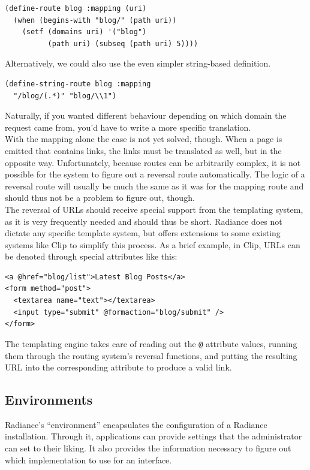 \documentclass{sig-alternate}
\begin{document}
\begin{verbatim}
(define-route blog :mapping (uri)
  (when (begins-with "blog/" (path uri))
    (setf (domains uri) '("blog")
          (path uri) (subseq (path uri) 5))))
\end{verbatim}

Alternatively, we could also use the even simpler string-based definition.

\begin{verbatim}
(define-string-route blog :mapping
  "/blog/(.*)" "blog/\\1")
\end{verbatim}

Naturally, if you wanted different behaviour depending on which domain the request came from, you'd have to write a more specific translation. \\

With the mapping alone the case is not yet solved, though. When a page is emitted that contains links, the links must be translated as well, but in the opposite way. Unfortunately, because routes can be arbitrarily complex, it is not possible for the system to figure out a reversal route automatically. The logic of a reversal route will usually be much the same as it was for the mapping route and should thus not be a problem to figure out, though. \\

The reversal of URLs should receive special support from the templating system, as it is very frequently needed and should thus be short. Radiance does not dictate any specific template system, but offers extensions to some existing systems like Clip\cite{clip} to simplify this process. As a brief example, in Clip, URLs can be denoted through special attributes like this:

\begin{verbatim}
<a @href="blog/list">Latest Blog Posts</a>
<form method="post">
  <textarea name="text"></textarea>
  <input type="submit" @formaction="blog/submit" />
</form>
\end{verbatim}

The templating engine takes care of reading out the \texttt{@} attribute values, running them through the routing system's reversal functions, and putting the resulting URL into the corresponding attribute to produce a valid link.

\subsection{Environments}
Radiance's ``environment'' encapsulates the configuration of a Radiance installation. Through it, applications can provide settings that the administrator can set to their liking. It also provides the information necessary to figure out which implementation to use for an interface. \\
\end{document}
